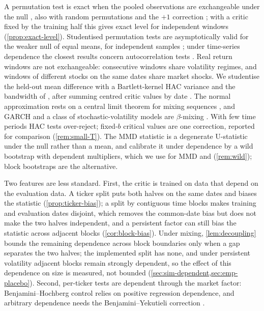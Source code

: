 A permutation test is exact when the pooled observations are exchangeable under the null
\citep{lehmann2022testing}, also with random permutations and the $+1$ correction
\citep{hemerik2018exact,phipson2010permutation}; with a critic fixed by the training half this
gives exact level for independent windows (\cref{prop:exact-level}). Studentised permutation tests
are asymptotically valid for the weaker null of equal means, for independent samples
\citep{janssen1997studentized,chung2013exact}; under time-series dependence the closest results
concern autocorrelation tests \citep{romano2022permutation}. Real return windows are not
exchangeable: consecutive windows share volatility regimes, and windows of different stocks on the
same dates share market shocks. We studentise the held-out mean difference with a Bartlett-kernel
HAC variance \citep{newey1987simple} and the bandwidth of \citet{andrews1991heteroskedasticity},
after summing centred critic values by date \citep{driscoll1998consistent}. The normal
approximation rests on a central limit theorem for mixing sequences \citep{herrndorf1984functional},
and GARCH and a class of stochastic-volatility models are $\beta$-mixing
\citep{carrasco2002mixing}. With few time periods HAC tests over-reject; fixed-$b$ critical values
\citep{kiefer_2005_new} are one correction, reported for comparison (\cref{rem:small-T}). The MMD
statistic is a degenerate U-statistic under the null rather than a mean, and
\citet{chwialkowski2014wild} calibrate it under dependence by a wild bootstrap with dependent
multipliers, which we use for MMD and \SigMMD{} (\cref{rem:wild}); block bootstraps
\citep{kunsch1989jackknife,politis1994stationary,lahiri2003resampling} are the alternative.

Two features are less standard. First, the critic is trained on data that depend on the evaluation
data. A ticker split puts both halves on the same dates and biases the statistic
(\cref{prop:ticker-bias}); a split by contiguous time blocks makes training and evaluation dates
disjoint, which removes the common-date bias but does not make the two halves independent, and
a persistent factor can still bias the statistic across adjacent blocks (\cref{cor:block-bias}). Under
mixing, \cref{lem:decoupling} bounds the remaining dependence across block boundaries only when a
gap separates the two halves; the implemented split has none, and under persistent volatility
adjacent blocks remain strongly dependent, so the effect of this dependence on size is measured,
not bounded (\cref{sec:sim-dependent,sec:emp-placebo}). Second, per-ticker tests are
dependent through the market factor: Benjamini--Hochberg control relies on positive regression
dependence, and arbitrary dependence needs the Benjamini--Yekutieli correction
\citep{benjamini1995controlling,benjamini2001control}.

